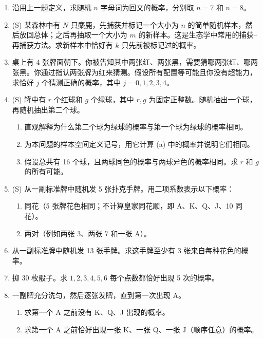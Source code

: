 \documentclass[UTF8,12pt,a4paper,fontset=fandol]{ctexart}
\begin{document}
\begin{enumerate}
  \item 沿用上一题定义，求随机 $n$ 字母词为回文的概率，分别取 $n=7$ 和 $n=8$。

  \item (S) 某森林中有 $N$ 只麋鹿，先捕获并标记一个大小为 $n$ 的简单随机样本，然后放回总体；之后再抽取一个大小为 $m$ 的新样本。这是生态学中常用的捕获--再捕获方法。求新样本中恰好有 $k$ 只先前被标记过的概率。

  \item 桌上有 4 张牌面朝下。你被告知其中两张红、两张黑，需要猜哪两张红、哪两张黑。你通过指认两张牌为红来猜测。假设所有配置等可能且你没有超能力，求恰好 $j$ 个猜测正确的概率，其中 $j=0,1,2,3,4$。

  \item (S) 罐中有 $r$ 个红球和 $g$ 个绿球，其中 $r,g$ 为固定正整数。随机抽出一个球，再随机抽出第二个球。
  \begin{enumerate}
    \item 直观解释为什么第二个球为绿球的概率与第一个球为绿球的概率相同。
    \item 为本问题的样本空间定义记号，用它计算 (a) 中的概率并说明它们相同。
    \item 假设总共有 16 个球，且两球同色的概率与两球异色的概率相同。求 $r$ 和 $g$ 的所有可能。
  \end{enumerate}

  \item (S) 从一副标准牌中随机发 5 张扑克手牌。用二项系数表示以下概率：
  \begin{enumerate}
    \item 同花（5 张牌花色相同；不计算皇家同花顺，即 A、K、Q、J、10 同花）。
    \item 两对（例如两张 3、两张 7 和一张 A）。
  \end{enumerate}

  \item 从一副标准牌中随机发 13 张手牌。求这手牌至少有 3 张来自每种花色的概率。

  \item 掷 30 枚骰子。求 $1,2,3,4,5,6$ 每个点数都恰好出现 5 次的概率。

  \item 一副牌充分洗匀，然后逐张发牌，直到第一次出现 A。
  \begin{enumerate}
    \item 求第一个 A 之前没有 K、Q、J 出现的概率。
    \item 求第一个 A 之前恰好出现一张 K、一张 Q、一张 J（顺序任意）的概率。
  \end{enumerate}


\end{enumerate}
\end{document}
